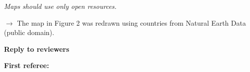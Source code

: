 \documentclass[10pt,a4paper,sans]{moderncv}
\begin{document}

\textit{Maps should use only open resources.}

\medskip

$\rightarrow$ The map in Figure 2 was redrawn using countries from Natural Earth Data (public domain).


\bigskip

\textbf{Reply to reviewers}


\medskip


\textbf{First referee:}

\medskip


\end{document}
